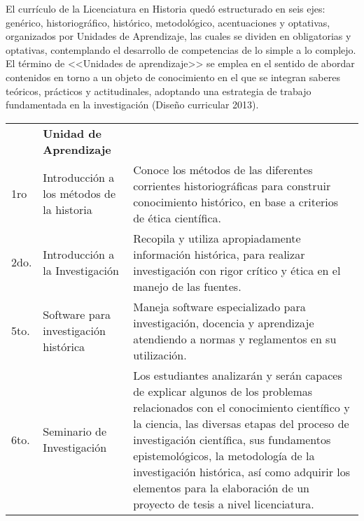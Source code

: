 \smallskip
\enlargethispage{1\baselineskip}
El currículo de la Licenciatura en Historia quedó estructurado en seis 
ejes: genérico, historiográfico, histórico, metodológico, acentuaciones 
y optativas, organizados por Unidades de Aprendizaje, las cuales se 
dividen en obligatorias y optativas, contemplando  el desarrollo de 
competencias de lo simple a lo complejo. El término de <<Unidades de 
aprendizaje>> se emplea en el sentido de abordar contenidos en torno a 
un objeto de conocimiento en el que se integran saberes teóricos, 
prácticos y actitudinales, adoptando una estrategia de trabajo\linebreak 
fundamentada en la investigación (Diseño curricular 2013). 


\bigskip
\begin{scriptsize}
\begin{flushleft}
\tablefirsthead{}
\tablehead{}
\tabletail{}
\tablelasttail{}
\begin{supertabular}{|m{0.062\textwidth}|m{0.32\textwidth}|m{0.56\textwidth}|}
\hline
{}\\\hline
{} &
{\bfseries Unidad de Aprendizaje} &
\centering{}\\\hline
1ro &
Introducción a los métodos de la historia &
Conoce los métodos de las diferentes corrientes historiográficas para
construir conocimiento histórico, en base a criterios de ética
científica.\\\hline
2do.  &
Introducción a la Investigación &
Recopila y utiliza apropiadamente información histórica, para realizar
investigación con rigor crítico y ética en el manejo de las
fuentes.\\\hline
5to. &
Software para investigación histórica &
Maneja software especializado para investigación, docencia y aprendizaje
atendiendo a normas y reglamentos en su utilización.\\\hline
6to. &
Seminario de Investigación &
Los estudiantes analizarán y serán capaces de explicar algunos de los
problemas relacionados con el conocimiento científico y la ciencia, las
diversas etapas del proceso de investigación científica, sus fundamentos
epistemológicos, la metodología de la investigación histórica, así como
adquirir  los elementos para la elaboración de un proyecto de tesis a nivel
licenciatura.\\\hline

\end{supertabular}
\end{flushleft}
\end{scriptsize}

